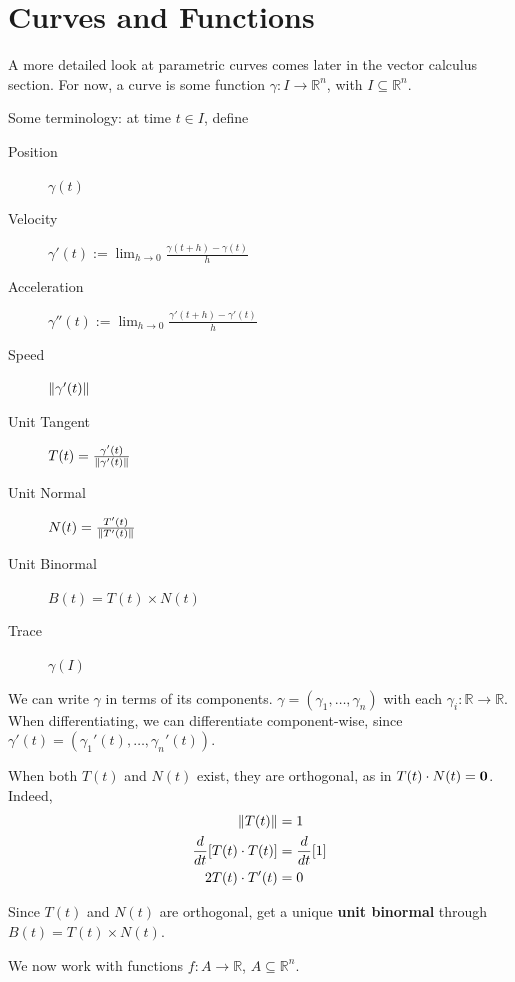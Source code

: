 \section{Curves and Functions}

A more detailed look at parametric curves comes later in the vector calculus section. For now, a curve is some function $\gamma : I \to \mathbb{R}^n$, with $I \subseteq \mathbb{R}^n$.

\begin{definition}
    Some terminology: at time $t \in I$, define
    \begin{description}
        \item[Position] $\gamma(t)$
        \item[Velocity] $\gamma'(t) := \displaystyle \lim_{h \to 0} \frac{\gamma(t+h) - \gamma(t)}{h}$
        \item[Acceleration] $\gamma''(t) := \displaystyle \lim_{h \to 0} \frac{\gamma'(t+h) - \gamma'(t)}{h}$
        \item[Speed] $\lVert\gamma'(t)\rVert$
        \item[Unit Tangent] $T(t) = \frac{\gamma'(t)}{\lVert\gamma'(t)\rVert}$
        \item[Unit Normal] $N(t) = \frac{T'(t)}{\lVert T'(t)\rVert}$
        \item[Unit Binormal] $B(t) = T(t) \times N(t)$
        \item[Trace] $\gamma(I)$
    \end{description}
\end{definition}

We can write $\gamma$ in terms of its components. $\gamma = (\gamma_1, \dots, \gamma_n)$ with each $\gamma_i : \mathbb{R} \to \mathbb{R}$. When differentiating, we can differentiate component-wise, since $\gamma'(t) = (\gamma_1'(t), \dots, \gamma_n'(t))$.

When both $T(t)$ and $N(t)$ exist, they are orthogonal, as in $T(t) \cdot N(t) = \mathbf{0}$. Indeed,
\begin{align*}
    \lVert T(t)\rVert &= 1 \\
    \frac{d}{dt} [T(t) \cdot T(t)] &= \frac{d}{dt}[1] \\
    2T(t) \cdot T'(t) &= 0
\end{align*}

Since $T(t)$ and $N(t)$ are orthogonal, get a unique \textbf{unit binormal} through $B(t) = T(t) \times N(t)$.

\gline

We now work with functions $f : A \to \mathbb{R}$, $A \subseteq \mathbb{R}^n$.

